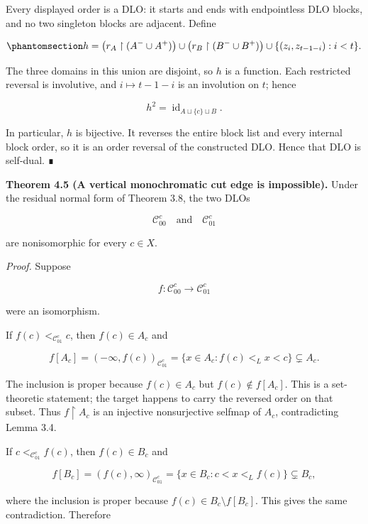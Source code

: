 \documentclass[
  english,
  11pt,
  reqno]{amsart}
\begin{document}
Every displayed order is a DLO: it starts and ends with endpointless DLO
blocks, and no two singleton blocks are adjacent. Define

\begin{equation}\protect\phantomsection\label{eq:selfdual-amalgamation-map}{
h
=
\bigl(r_A\restriction(A^-\cup A^+)\bigr)
\cup
\bigl(r_B\restriction(B^-\cup B^+)\bigr)
\cup
\{(z_i,z_{t-1-i}):i<t\}.
}\end{equation}

The three domains in this union are disjoint, so \(h\) is a function.
Each restricted reversal is involutive, and \(i\mapsto t-1-i\) is an
involution on \(t\); hence

\[
h^2=\operatorname{id}_{A\sqcup\{c\}\sqcup B}.
\]

In particular, \(h\) is bijective. It reverses the entire block list and
every internal block order, so it is an order reversal of the
constructed DLO. Hence that DLO is self-dual. ∎

\protect{}\label{thm:4-5-vertical-exclusion}

\textbf{Theorem 4.5 (A vertical monochromatic cut edge is impossible).}
Under the residual normal form of Theorem 3.8, the two DLOs

\[
\mathcal C_{00}^c
\quad\text{and}\quad
\mathcal C_{01}^c
\]

are nonisomorphic for every \(c\in X\).

\emph{Proof.} Suppose

\[
f:\mathcal C_{00}^c\longrightarrow\mathcal C_{01}^c
\]

were an isomorphism.

If \(f(c)<_{\mathcal C_{01}^c}c\), then \(f(c)\in A_c\) and

\[
f[A_c]
=
(-\infty,f(c))_{\mathcal C_{01}^c}
=
\{x\in A_c:f(c)<_Lx<c\}
\subsetneq
A_c.
\]

The inclusion is proper because \(f(c)\in A_c\) but
\(f(c)\notin f[A_c]\). This is a set-theoretic statement; the target
happens to carry the reversed order on that subset. Thus
\(f\upharpoonright A_c\) is an injective nonsurjective selfmap of
\(A_c\), contradicting Lemma 3.4.

If \(c<_{\mathcal C_{01}^c}f(c)\), then \(f(c)\in B_c\) and

\[
f[B_c]
=
(f(c),\infty)_{\mathcal C_{01}^c}
=
\{x\in B_c:c<x<_L f(c)\}
\subsetneq
B_c,
\]

where the inclusion is proper because \(f(c)\in B_c\setminus f[B_c]\).
This gives the same contradiction. Therefore
\end{document}
